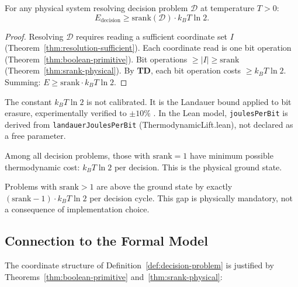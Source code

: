 \begin{theorem}\label{thm:thermo-derived}
For any physical system resolving decision problem $\mathcal{D}$ at temperature $T > 0$:
\[
E_{\mathrm{decision}} \geq \mathrm{srank}(\mathcal{D}) \cdot k_B T \ln 2.
\]
\begin{proof}
Resolving $\mathcal{D}$ requires reading a sufficient coordinate set $I$
(Theorem~\ref{thm:resolution-sufficient}). Each coordinate read is one bit
operation (Theorem~\ref{thm:boolean-primitive}). Bit operations $\geq |I| \geq \mathrm{srank}$
(Theorem~\ref{thm:srank-physical}). By \textbf{TD}, each bit operation costs
$\geq k_B T \ln 2$. Summing: $E \geq \mathrm{srank} \cdot k_B T \ln 2$.
\end{proof}
The constant $k_B T \ln 2$ is not calibrated. It is the Landauer bound
applied to bit erasure, experimentally verified to $\pm 10\%$
\cite{berut2012experimental}. In the Lean model, \texttt{joulesPerBit} is
derived from \texttt{landauerJoulesPerBit} (ThermodynamicLift.lean), not
declared as a free parameter.
\end{theorem}

\begin{corollary}[srank $= 1$ is the Energy Ground State]\label{cor:ground-state}
Among all decision problems, those with $\mathrm{srank} = 1$ have minimum
possible thermodynamic cost: $k_B T \ln 2$ per decision. This is the physical
ground state.

Problems with $\mathrm{srank} > 1$ are above the ground state by exactly
$(\mathrm{srank} - 1) \cdot k_B T \ln 2$ per decision cycle. This gap is
physically mandatory, not a consequence of implementation choice.
\end{corollary}

\subsection{Connection to the Formal Model}\label{sec:physical-to-formal}

The coordinate structure of Definition~\ref{def:decision-problem} is justified
by Theorems~\ref{thm:boolean-primitive} and~\ref{thm:srank-physical}:


